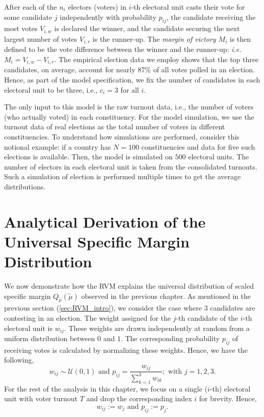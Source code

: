 After each of the $n_i$ electors (voters) in $i$-th electoral unit casts their vote for some candidate $j$ independently with probability $p_{ij}$, the candidate receiving the most votes $V_{i, w}$ is declared the winner, and the candidate securing the next largest number of votes $V_{i, r}$ is the runner-up. The \emph{margin of victory} $M_i$ is then defined to be the vote difference between the winner and the runner-up: \emph{i.e.} $M_i = V_{i, w} - V_{i, r}$. The empirical election data we employ shows that the top three candidates, on average, account for nearly 87\% of all votes polled in an election.
Hence, as part of the model specification, we fix the number of candidates in each electoral unit to be three, i.e., $c_i = 3$ for all $i$.

The only input to this model is the raw turnout data, i.e., the number of voters (who actually voted) in each constituency. For the model simulation, we use the turnout data of real elections as the total number of voters in different constituencies. To understand how simulations are performed, consider this notional example: if a country has $N=100$ constituencies and data for five such elections is available. Then, the model is simulated on $500$ electoral units. The number of electors in each electoral unit is taken from the consolidated turnouts. Such a simulation of election is performed multiple times to get the average distributions.
\section{Analytical Derivation of the Universal Specific Margin Distribution}
\label{sec:RVM_first_symphony}
We now demonstrate how the RVM explains the universal distribution of scaled specific margin $Q_{\widetilde{\mu}}\left(\widetilde{\mu}\right)$ observed in the previous chapter. As mentioned in the previous section (\ref{sec:RVM_intro}), we consider the case where $3$ candidates are contesting in an election. The weight assigned for the $j$-th candidate of the $i$-th electoral unit is $w_{ij}$. These weights are drawn independently at random from a uniform distribution between $0$ and $1$.  The corresponding probability $p_{ij}$ of receiving votes is calculated by normalizing these weights. Hence, we have the following,
\begin{equation}
    w_{ij} \sim \mathcal{U}(0, 1) \text{ and } p_{ij} = \frac{w_{ij}}{\sum_{k=1}^3 w_{ik}}; \text{ with } j = 1, 2, 3.
\end{equation}
For the rest of the analysis in this chapter, we focus on a single ($i$-th) electoral unit with voter turnout $T$ and drop the corresponding index $i$ for brevity. Hence,
\begin{equation}
    w_{ij} := w_j \text{ and } p_{ij} := p_j.
\end{equation}

